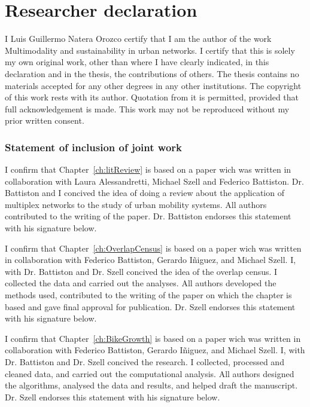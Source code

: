 \documentclass[a4paper,twoside,12pt]{book}
\begin{document}
\mbox{}

\pagestyle{empty}

\newpage


\chapter*{Researcher declaration}
I Luis Guillermo Natera Orozco certify that I am the author of the work Multimodality and sustainability in urban networks. I certify that this is solely my own original work, other than where I have clearly indicated, in this declaration and in the thesis, the contributions of others. The thesis contains no materials accepted for any other degrees in any other institutions.  The copyright of this work rests with its author. Quotation from it is permitted, provided that full acknowledgement is made. This work may not be reproduced without my prior written consent.

\subsection*{Statement of inclusion of joint work}
I confirm that Chapter~\ref{ch:litReview} is based on a paper wich was written in collaboration with Laura Alessandretti, Michael Szell and Federico Battiston. Dr. Battiston and I concived the idea of doing a review about the application of multiplex networks to the study of urban mobility systems. All authors contributed to the writing of the paper. Dr. Battiston endorses this statement with his signature below.

\vspace{.2cm}

I confirm that Chapter~\ref{ch:OverlapCensus} is based on a paper wich was written in collaboration with Federico Battiston, Gerardo I\~niguez, and Michael Szell. I, with Dr. Battiston and Dr. Szell concived the idea of the overlap census. I collected the data and carried out the analyses. All authors developed the methods used, contributed to the writing of the paper on which the chapter is based and gave final approval for publication. Dr. Szell endorses this statement with his signature below.

\vspace{.2cm}

I confirm that Chapter~\ref{ch:BikeGrowth} is based on a paper wich was written in collaboration with Federico Battiston, Gerardo I\~niguez, and Michael Szell. I, with Dr. Battiston and Dr. Szell concived the research. I collected, processed and cleaned data, and carried out the computational analysis. All authors designed the algorithms, analysed the data and results, and helped draft the manuscript. Dr. Szell endorses this statement with his signature below.
\end{document}
